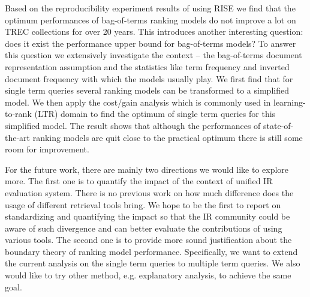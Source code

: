 Based on the reproducibility experiment results of using RISE we find that 
the optimum performances of bag-of-terms ranking models do not improve a lot 
on TREC collections for over 20 years. 
This introduces another interesting question: does it exist the performance 
upper bound for bag-of-terms models? To answer this question we extensively 
investigate the context -- the bag-of-terms document representation 
assumption and the statistics like term frequency and inverted document 
frequency with which the models usually play.
We first find that for single term queries several ranking models can be 
transformed to a simplified model. We then apply the cost/gain analysis which 
is commonly used in learning-to-rank (LTR) domain to find the optimum of 
single term queries for this simplified model.
The result shows that although the performances of state-of-the-art 
ranking models are quit close to the practical optimum there is still some 
room for improvement.

For the future work, there are mainly two directions we would like to explore more. 
The first one is to quantify the impact of the context of unified 
IR evaluation system. There is no previous work on how much difference does 
the usage of different retrieval tools bring.
We hope to be the first to report on standardizing and quantifying the 
impact so that the IR community could be aware of such divergence and can 
better evaluate the contributions of using various tools. 
The second one is to provide more sound justification about the boundary 
theory of ranking model performance. Specifically, we want to extend the 
current analysis on the single term queries to multiple term queries. 
We also would like to try other method, e.g. explanatory analysis, 
to achieve the same goal.
